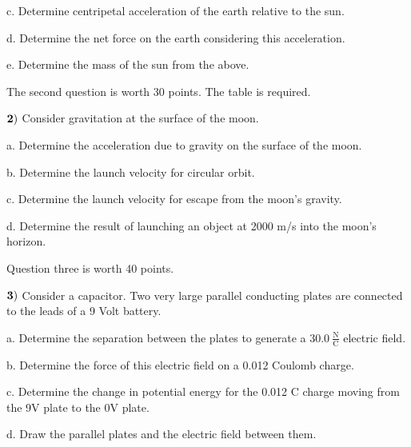 \documentclass{article}
\begin{document}
  \vspace{3.5cm}
  
 c.  Determine centripetal acceleration of the earth relative to the sun.
 
  \vspace{3.5cm}
 
 d. Determine the net force on the earth considering this acceleration.
 
  \vspace{3.5cm}
 
 e. Determine the mass of the sun from the above.
 
  
 
 


  \newpage
  The second question is worth 30 points.  The table is required.
  
 $\bf{2)}$  Consider gravitation at the surface of the moon.
 
 \vspace{1cm}

  
 a.  Determine the acceleration due to gravity on the surface of the moon.
   \vspace{4.5cm}
 
 b.  Determine the launch velocity for circular orbit.
   \vspace{4.5cm}
 
 c.  Determine the launch velocity for escape from the moon's gravity.
   \vspace{4.5cm}
 
 d.  Determine the result of launching an object at 2000 m/s into the moon's horizon.
 

  \newpage

Question three is worth 40 points.

  $\bf{3)}$  Consider a capacitor.  Two very large parallel conducting plates are connected to the leads of a 9 Volt battery.
  \vspace{0.5cm}
  
  a.  Determine the separation between the plates to generate a $30.0\  \frac{\text{N}}{\text{C}}$ electric field.
    \vspace{4.5cm}
  
  b.  Determine the force of this electric field on a 0.012 Coulomb charge.
    \vspace{4.5cm}
  
  c.  Determine the change in potential energy for the 0.012 C charge moving from the 9V plate to the 0V plate.
    \vspace{4.5cm}
  
  d. Draw the parallel plates and the electric field between them.  
  
  
 
\end{document}
